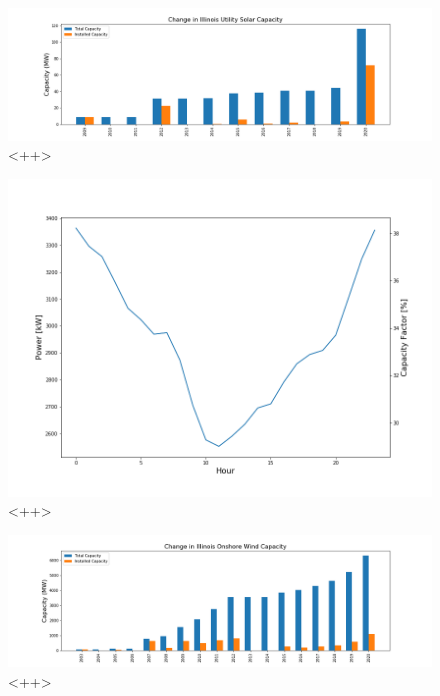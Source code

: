 \begin{figure}[H]
	\centering
	\includegraphics[width=\columnwidth]{./img/cap/solar.png}
	\caption{<++>}
	\label{fig:<++>}
\end{figure}

\begin{figure}[H]
	\centering
	\includegraphics[width=\columnwidth]{./img/cap/wind_cf.png}
	\caption{<++>}
	\label{fig:<++>}
\end{figure}

\begin{figure}[H]
	\centering
	\includegraphics[width=\columnwidth]{./img/cap/onshore_wind.png}
	\caption{<++>}
	\label{fig:<++>}
\end{figure}

